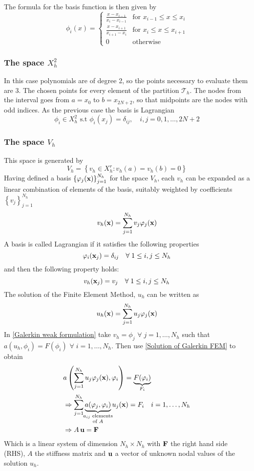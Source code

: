 The formula for the basis function is then given by 
\begin{equation}
    \phi_i(x) = \begin{cases}
        \frac{x-x_{i-1}}{x_i - x_{i-1}} & \text{for }x_{i-1} \leq x \leq x_i \\
        \frac{x-x_{i+1}}{x_{i+1} - x_i} & \text{for }x_i \leq x \leq x_{i+1} \\
        0 & \text{otherwise}
    \end{cases}
\end{equation}
\subsubsection*{The space \(X^2_h\)}
In this case polynomials are of degree 2, so the points necessary to evaluate them are \(3\). The chosen points for every element of the partition \(\mathcal{T}_h\). The nodes from the interval goes from \(a = x_0\) to \(b = x_{2N + 2}\), so that midpoints are the nodes with odd indices. As the previous case the basis is Lagrangian
\[
    \phi_i \in X^2_h \text{ s.t } \phi_i(x_j) = \delta_{ij}, \quad i, j = 0, 1, \ldots, 2N+2
\]
\subsubsection*{The space \(V_h\)}
This space is generated by 
\[
    V_h = \left\{v_h \in X^r_h : v_h(a) = v_h(b) = 0 \right\}
\]
Having defined a basis \(\left\lbrace\varphi_j(\textbf{x})\right\rbrace_{j=1}^{N_h}\) for the space \(V_h\), each \(v_h\) can be expanded as a linear combination of elements of the basis, suitably weighted by coefficients \(\left\{v_j\right\}_{j=1}^{N_h}\)
\[
    v_h(\textbf{x}) = \sum_{j=1}^{N_h} v_j \varphi_j(\textbf{x})
\]
A basis is called Lagrangian if it satisfies the following properties
\[
    \varphi_i(\textbf{x}_j) = \delta_{ij} \quad \forall \; 1 \leq i,j \leq N_h
\]
and then the following property holds:
\[
    v_h(\textbf{x}_j) = v_j \quad \forall \; 1 \leq i,j \leq N_h
\]
The solution of the Finite Element Method, \(u_h\) can be written as 
\begin{equation}
    u_h(\textbf{x}) = \sum_{j=1}^{N_h} u_j\varphi_j (\textbf{x}) \label{Solution of Galerkin FEM}
\end{equation}
In \eqref{Galerkin weak formulation} take \(v_h = \phi_j\) \(\forall \; j = 1,\ldots, N_h \) such that \(a(u_h,\phi_i) = F(\phi_i)\) \(\forall \; i = 1,\ldots,N_h\). Then use \eqref{Solution of Galerkin FEM} to obtain 
\begin{align*}
    &a\left( \sum_{j=1}^{N_h} u_j\phi_j (\vect{x}), \phi_i \right) = \underbrace{F(\phi_i)}_{F_i} \\ 
    &\Rightarrow \sum_{j=1}^{N_h} \underbrace{a(\phi_j, \phi_i)}_{\mathclap{\substack{a_{ij} \text{ elements}\\ \text{of } A}}} u_j (\vect{x}) = F_i \quad i = 1, \ldots, N_h \\
    &\Rightarrow A\,\vect{u} = \vect{F}
\end{align*}
Which is a linear system of dimension \(N_h \times N_h\) with \(\textbf{F}\) the right hand side (RHS), \(A\) the stiffness matrix and \(\textbf{u}\) a vector of unknown nodal values of the solution \(u_h\).
